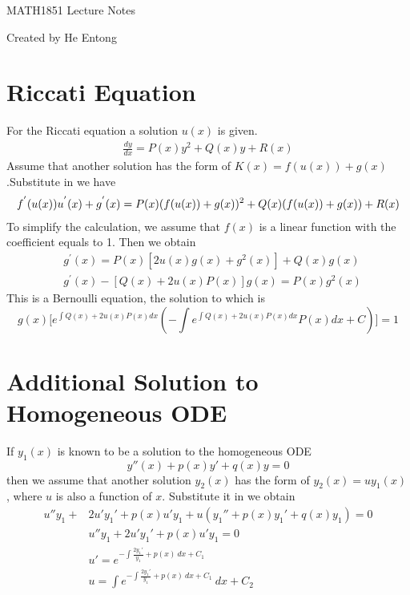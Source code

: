 \documentclass[25pt]{article}
\begin{document}
MATH1851 Lecture Notes \par
\small{Created by He Entong}
\section{Riccati Equation}
For the Riccati equation a solution $u(x)$ is given.
\begin{equation}
\begin{aligned}
    \frac{dy}{dx} = P(x)y^2 + Q(x)y + R(x)
\end{aligned}
\end{equation}
Assume that another solution has the form of $K(x) = f(u(x)) + g(x)$.Substitute in we have
\begin{equation}
\begin{aligned}
    f^{'}(u(x))u^{'}(x) + g^{'}(x) = P(x)(f(u(x)) + g(x))^2 + Q(x)(f(u(x)) + g(x)) + R(x) \notag
\end{aligned}
\end{equation}
To simplify the calculation, we assume that $f(x)$ is a linear function with the coefficient equals to 1. Then we obtain
\begin{equation}
\begin{aligned}
    &g^{'}(x) = P(x)[2u(x)g(x) + g^{2}(x)] + Q(x)g(x) \\
    &g^{'}(x) - [Q(x) + 2u(x)P(x)]g(x) = P(x)g^2(x)
\end{aligned}
\end{equation}
This is a Bernoulli equation, the solution to which is
\begin{equation}
    g(x)\bigg[e^{\int Q(x)+2u(x)P(x)dx}(-\int e^{\int Q(x) + 2u(x)P(x)dx} P(x)dx + C)\bigg] = 1
\end{equation}
\section{Additional Solution to Homogeneous ODE}
 If $y_1(x)$ is known to be a solution to the homogeneous ODE
\begin{equation}
    y''(x) + p(x)y' +q(x)y = 0
\end{equation}
then we assume that another solution $y_2(x)$ has the form of $y_2(x) = uy_1(x)$, where $u$ is also a function of $x$. Substitute it in we obtain
\begin{equation}
\begin{aligned}
    u''y_1 + &2u'y_1'+p(x)u'y_1 + u(y_1''+p(x)y_1'+q(x)y_1) = 0 \\
    &u''y_1 + 2u'y_1' + p(x)u'y_1 = 0 \\
    &u' = e^{-\int \frac{2y_1'}{y_1} + p(x)~dx + C_1} \\
    &u = \int e^{-\int \frac{2y_1'}{y_1} + p(x)~dx + C_1} ~dx + C_2
\end{aligned}
\end{equation}
\end{document}
